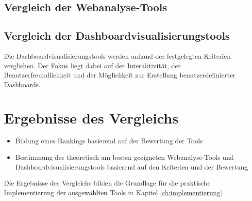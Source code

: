 \subsection{Vergleich der Webanalyse-Tools}

\subsection{Vergleich der Dashboardvisualisierungstools}
Die Dashboardvisualisierungstools werden anhand der festgelegten Kriterien verglichen. Der Fokus liegt dabei auf der Interaktivität, der Benutzerfreundlichkeit und der Möglichkeit zur Erstellung benutzerdefinierter Dashboards.

\section{Ergebnisse des Vergleichs}
\begin{itemize}
    \item Bildung eines Rankings basierend auf der Bewertung der Tools
    \item Bestimmung des theoretisch am besten geeigneten Webanalyse-Tools und Dashboardvisualisierungstools basierend auf den Kriterien und der Bewertung
\end{itemize}

Die Ergebnisse des Vergleichs bilden die Grundlage für die praktische Implementierung der ausgewählten Tools in Kapitel \ref{ch:implementierung}.
